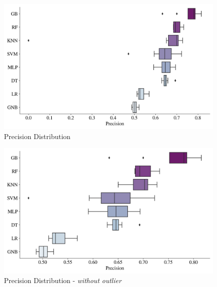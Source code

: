 \begin{figure}[H]
    \centering
    \caption{Precision Distribution}\vspace{0.5em}
    \label{fig:precdist}
    \includegraphics[width=140mm]{Figures/PRECISION_Distribution.jpg}
    
    \vspace{-1em}
\end{figure}

\begin{figure}[H]
    \centering
    \caption{Precision Distribution - \textit{without outlier}}\vspace{0.5em}
    \label{fig:precdistwoout}
    \includegraphics[width=140mm]{Figures/PRECISION_WO_OUTLIERS_Distribution.jpg}
    
    \vspace{-1em}
\end{figure}

